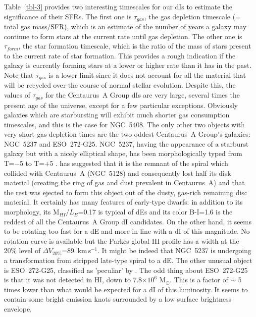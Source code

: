 \documentclass[preprint]{aastex}
\def\kms{\mbox{\,km\,s$^{-1}$}}
\begin{document}
Table~\ref{tbl-3} provides two interesting timescales for our dIs 
to estimate the significance of their SFRs. The first one is $\tau _{gas}$,
the gas depletion timescale (= total gas mass/SFR), which is an estimate
of the number of years a galaxy may continue to form stars at the current
rate until gas depletion. The other one is $\tau _{form}$, the star formation 
timescale, which is the ratio of the mass of stars present to the current rate
of star formation. This provides a rough indication if the galaxy is 
currently forming stars at a lower or higher rate than it has in the past. 
Note that $\tau _{gas}$ is a lower limit since it does not account for
all the material that will be recycled over the course 
of normal stellar evolution. Despite this, the values of 
$\tau _{gas}$ for the Centaurus~A Group dIs are very large, several times the present
age of the universe, except for a few particular exceptions. Obviously
galaxies which are starbursting will exhibit much shorter gas consumption
timescales, and this is the case for NGC~5408. The only other two objects with
very short gas depletion times are the two oddest Centaurus~A Group's galaxies:
NGC~5237 and ESO~272-G25.
NGC~5237, having the appearance of a starburst galaxy but with a nicely elliptical shape,
has been morphologically typed from T=$-$5 \citep{vvi74}
to T=$+$5 \citep{ph98}. \citet{t92} has suggested
that it is the remnant of the spiral which collided with Centaurus~A (NGC~5128)
and consequently lost half its disk material (creating the ring of gas and 
dust prevalent in Centaurus~A) and that the rest was ejected to form this 
object out of the dusty, gas-rich remaining disc material. It certainly has
many features of early-type dwarfs: in addition to its morphology, its
M$_{HI}/L_B$=0.17 is typical of dEs and its color B-I=1.6 \citep{c95} 
is the reddest of all the Centaurus~A Group dI candidates. On the other hand, it
seems to be rotating too fast for a dE and more in line with a dI of this
magnitude. No rotation curve is available but the Parkes global HI profile
has a width at the 20\% level of $\Delta V_{20\%}$=89 \kms \citep{cfcq97}.
It might be indeed that NGC~5237 is undergoing a transformation from
stripped late-type spiral to a dE.  
The other unusual object is ESO~272-G25, classified as 'peculiar' by 
\citet{l84}.
The odd thing about ESO~272-G25 is that it was not detected in HI,
down to 7.8$\times 10^6$ M$_\odot $. This is a factor of $\sim$ 5 times lower
than what would be expected for a dI of this luminosity. It seems to contain
some bright emission knots surrounded by a low surface brightness envelope,
\end{document}
